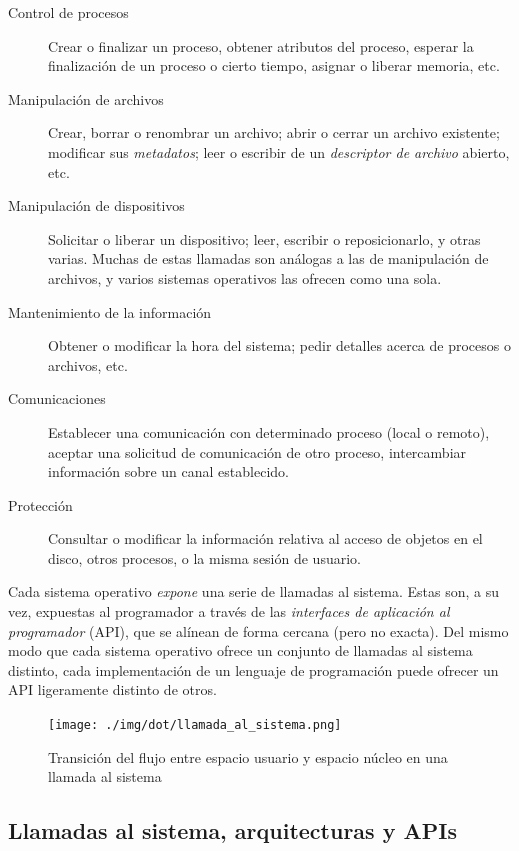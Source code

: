 \documentclass[11pt,fleqn]{book} %
\begin{document}
\begin{description}
\item[Control de procesos] Crear o finalizar un proceso, obtener
     atributos del proceso, esperar la finalización de un proceso o cierto tiempo, 
	asignar o liberar memoria, etc.
\item[Manipulación de archivos] Crear, borrar o renombrar un archivo;
     abrir o cerrar un archivo existente; modificar sus \emph{metadatos};
     leer o escribir de un \emph{descriptor de archivo} abierto, etc.
\item[Manipulación de dispositivos] Solicitar o liberar un dispositivo;
     leer, escribir o reposicionarlo, y otras varias. Muchas de estas
     llamadas son análogas a las de manipulación de archivos, y varios
     sistemas operativos las ofrecen como una sola.
\item[Mantenimiento de la información] Obtener o modificar la hora del
     sistema; pedir detalles acerca de procesos o archivos, etc.
\item[Comunicaciones] Establecer una comunicación con determinado
                    proceso (local o remoto), aceptar una solicitud de
                    comunicación de otro proceso, intercambiar
                    información sobre un canal establecido.
\item[Protección] Consultar o modificar la información relativa al
                acceso de objetos en el disco, otros procesos, o la
                misma sesión de usuario.
\end{description}

Cada sistema operativo \emph{expone} una serie de llamadas al
sistema. Estas son, a su vez, expuestas al programador a través de las
\emph{interfaces de aplicación al programador} (API), que se alínean de
forma cercana (pero no exacta). Del mismo modo que cada sistema
operativo ofrece un conjunto de llamadas al sistema distinto, cada
implementación de un lenguaje de programación puede ofrecer un API
ligeramente distinto de otros.

\begin{figure}[htb]
\centering
\texttt{[image: ./img/dot/llamada\_al\_sistema.png]}
\caption{\label{HW_llamada_al_sistema}Transición del flujo entre espacio usuario y espacio núcleo en una llamada al sistema}
\end{figure}
\subsection{Llamadas al sistema, arquitecturas y APIs}
\label{sec-2-7-1}
\label{HW_syscall_arch_api}
\end{document}
